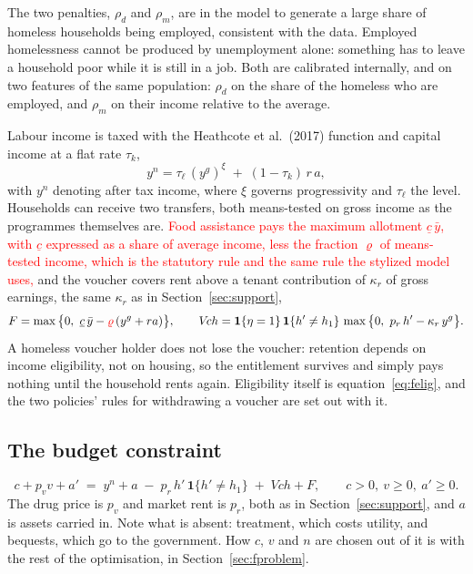 \documentclass[10pt]{article}
\begin{document}
The two penalties, $\rho_d$ and $\rho_m$, are in the model to generate a
large share of homeless households being employed, consistent with the data.
Employed homelessness cannot be produced by unemployment alone:
something has to leave a household poor while it is still in a job.
Both are calibrated internally, and on two features of the same population: $\rho_d$ on the share of the
homeless who are employed, and $\rho_m$ on their income relative to the average.

Labour income is taxed with the Heathcote et al.\ (2017) function and
capital income at a flat rate $\tau_k$,
\begin{equation}\label{eq:ftax}
y^{n}=\tau_{\ell}\,(y^{g})^{\xi}\;+\;(1-\tau_k)\,r\,a ,
\end{equation}
with $y^{n}$ denoting after tax income, where $\xi$ governs progressivity
and $\tau_{\ell}$ the level. Households can
receive two transfers, both means-tested on gross income as the programmes
themselves are. \textcolor{red}{Food assistance pays the maximum allotment $\underline c\,\bar y$, with $\underline c$ expressed}
\textcolor{red}{as a share of average income, less the fraction $\varrho$ of means-tested income, which is the}
\textcolor{red}{statutory rule and the same rule the stylized model uses,} and the voucher covers rent above a
tenant contribution of $\kappa_r$ of gross earnings, the same $\kappa_r$ as
in Section~\ref{sec:support},
\begin{equation}\label{eq:ftrans}
F=\max\big\{0,\ \underline c\,\bar y-\textcolor{red}{\varrho\,}(y^{g}+ra)\big\},
\qquad
V\!ch=\mathbf{1}\{\eta=1\}\,\mathbf{1}\{h'\neq h_1\}\,
\max\big\{0,\ p_r\, h'-\kappa_r\,y^{g}\big\}.
\end{equation}
A homeless voucher holder does not lose the voucher: retention depends on income
eligibility, not on housing, so the entitlement survives and simply pays nothing
until the household rents again. Eligibility itself is equation~\eqref{eq:felig}, and the two policies' rules for withdrawing a voucher are set out with it.

\subsection{The budget constraint}

\begin{equation}\label{eq:fbudget}
c+p_v v+a' \;=\; y^{n}+a\;-\;p_r\, h'\,\mathbf{1}\{h'\neq h_1\}\;+\;V\!ch+F,
\qquad c>0,\ v\ge0,\ a'\ge0 .
\end{equation}
The drug price is $p_v$ and market rent is $p_r$, both as in
Section~\ref{sec:support}, and $a$ is assets carried in. Note what is absent:
treatment, which costs utility, and bequests, which go to the government.
How $c$, $v$ and $n$ are chosen out of it is with the rest of the
optimisation, in Section~\ref{sec:fproblem}.
\end{document}
